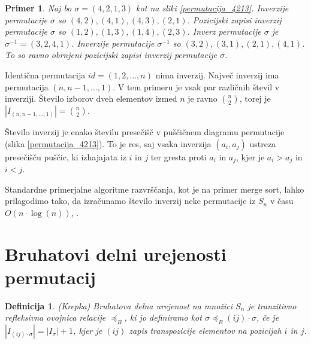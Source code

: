\documentclass[a4paper, 12pt]{book}
\newtheorem{definicija}{Definicija}[chapter]
\newtheorem{primer}{Primer}[chapter]
\begin{document}
\begin{primer}
    Naj bo $\sigma = (4, 2, 1, 3)$ kot na sliki \ref{permutacija_4213}. Inverzije permutacije $\sigma$ so $(4, 2), (4, 1), (4, 3), (2, 1)$. Pozicijski zapisi inverzij permutacije $\sigma$ so $(1, 2), (1, 3), (1, 4), (2, 3)$. Inverz permutacije $\sigma$ je $\sigma^{-1} = (3, 2, 4, 1)$. Inverzije permutacije $\sigma^{-1}$ so $(3, 2), (3, 1), (2, 1), (4, 1)$. To so ravno obrnjeni pozicijski zapisi inverzij permutacije $\sigma$.
\end{primer}

Identična permutacija $id = (1, 2, \dots, n)$ nima inverzij. Največ inverzij ima permutacija $(n, n-1, \dots, 1)$. V tem primeru je vsak par različnih števil v inverziji. Število izborov dveh elementov izmed $n$ je ravno $\binom{n}{2}$, torej je $|I_{(n, n-1, \dots, 1)}| = \binom{n}{2}$.

Število inverzij je enako številu presečišč v puščičnem diagramu permutacije (slika \ref{permutacija_4213}). To je res, saj vsaka inverzija $(a_i, a_j)$ ustreza presečišču puščic, ki izhajajata iz $i$ in $j$ ter gresta proti $a_i$ in $a_j$, kjer je $a_i > a_j$ in $i < j$.

Standardne primerjalne algoritme razvrščanja, kot je na primer merge sort, lahko prilagodimo tako, da izračunamo število inverzij neke permutacije iz $S_n$ v času $O(n \cdot \log(n))$, \cite{algorithmDesign}.

\section{ Bruhatovi delni urejenosti permutacij}

\begin{definicija}    
    (Krepka) Bruhatova  delna urejenost na množici $S_n$ je tranzitivno refleksivna ovojnica relacije $\preceq_{B}$, ki jo definiramo kot $\sigma \preceq_{B} (ij) \cdot \sigma$, če je $|I_{(ij) \cdot \sigma}| = |I_{\sigma}| + 1$, kjer je $(ij)$ zapis transpozicije elementov na pozicijah $i$ in $j$.
\end{definicija}
\end{document}
